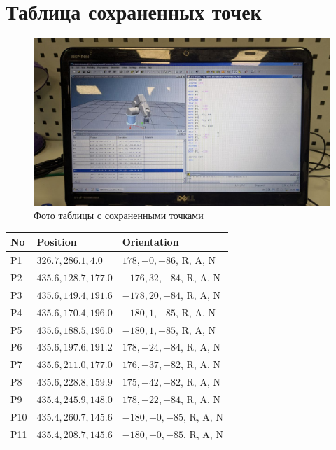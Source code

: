 \documentclass[a4paper, 12pt]{article}
\begin{document}
    \section{Таблица сохраненных точек}
    \begin{figure}[H]
        \centering
        \includegraphics[scale=0.36]{table.jpg}
        \captionsetup{skip=0pt}
        \caption{Фото таблицы с сохраненными точками}
        \label{fig:table}
    \end{figure}
    \begin{tabularx}{0.92\textwidth} { 
        | >{\raggedright\arraybackslash}X 
        | >{\raggedright\arraybackslash}X 
        | >{\raggedright\arraybackslash}X | }
       \hline
       No & Position & Orientation \\
       \hline
       P1 & $326.7, 286.1, 4.0$ & $178, -0, -86$, R, A, N \\
       \hline
       P2 & $435.6, 128.7, 177.0$ & $-176, 32, -84$, R, A, N \\
       \hline
       P3 & $435.6, 149.4, 191.6$ & $-178, 20, -84$, R, A, N \\
       \hline
       P4 & $435.6, 170.4, 196.0$ & $-180, 1, -85$, R, A, N \\
       \hline
       P5 & $435.6, 188.5, 196.0$ & $-180, 1, -85$, R, A, N \\
       \hline
       P6 & $435.6, 197.6, 191.2$ & $178, -24, -84$, R, A, N \\
       \hline
       P7 & $435.6, 211.0, 177.0$ & $176, -37, -82$, R, A, N \\
       \hline
       P8 & $435.6, 228.8, 159.9$ & $175, -42, -82$, R, A, N \\
       \hline
       P9 & $435.4, 245.9, 148.0$ & $178, -22, -84$, R, A, N \\
       \hline
       P10 & $435.4, 260.7, 145.6$ & $-180, -0, -85$, R, A, N \\
       \hline
       P11 & $435.4, 208.7, 145.6$ & $-180, -0, -85$, R, A, N \\
      \hline
    \end{tabularx}
\end{document}
